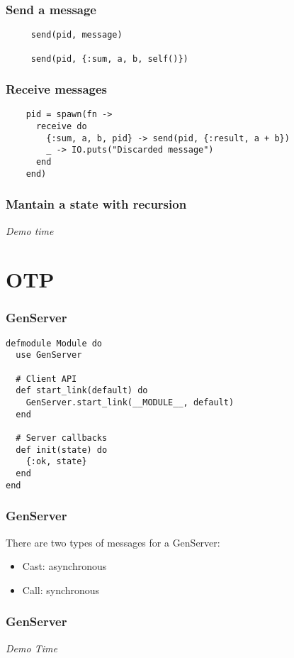 \documentclass{beamer}
\begin{document}
\begin{frame}[fragile]
  \frametitle{Send a message}
\begin{verbatim}
     send(pid, message)

     send(pid, {:sum, a, b, self()})
\end{verbatim}
\end{frame}

\begin{frame}[fragile]
  \frametitle{Receive messages}
\begin{verbatim}
    pid = spawn(fn ->
      receive do
        {:sum, a, b, pid} -> send(pid, {:result, a + b})
        _ -> IO.puts("Discarded message")
      end
    end)
\end{verbatim}
\end{frame}

\begin{frame}[fragile]
  \frametitle{Mantain a state with recursion}
  \begin{center}
    \textit{Demo time}
  \end{center}
\end{frame}

\section{OTP}
\begin{frame}[fragile]
  \frametitle{GenServer}
\begin{verbatim}
defmodule Module do
  use GenServer

  # Client API
  def start_link(default) do
    GenServer.start_link(__MODULE__, default)
  end

  # Server callbacks
  def init(state) do
    {:ok, state}
  end
end
\end{verbatim}
\end{frame}

\begin{frame}
  \frametitle{GenServer}
  There are two types of messages for a GenServer:
  \begin{itemize}
  \item Cast: asynchronous
  \item Call: synchronous
  \end{itemize}
\end{frame}

\begin{frame}
  \frametitle{GenServer}
  \begin{center}
    \textit{Demo Time}
  \end{center}
\end{frame}
\end{document}
